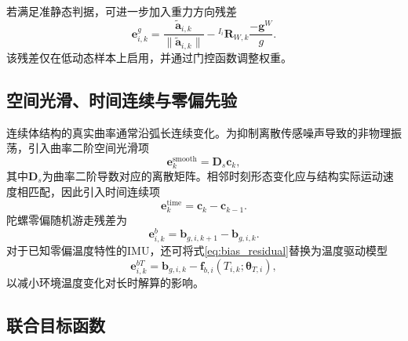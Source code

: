 若满足准静态判据，可进一步加入重力方向残差
\begin{equation}
    \bm e_{i,k}^{g}
    =\frac{\tilde{\bm a}_{i,k}}{\|\tilde{\bm a}_{i,k}\|}
    -{}^{I_i}\bm R_{W,k}\frac{-\bm g^W}{g}.
    \label{eq:gravity_residual}
\end{equation}
该残差仅在低动态样本上启用，并通过门控函数调整权重。

\subsection{空间光滑、时间连续与零偏先验}

连续体结构的真实曲率通常沿弧长连续变化。为抑制离散传感噪声导致的非物理振荡，引入曲率二阶空间光滑项
\begin{equation}
    \bm e_{k}^{\mathrm{smooth}}
    =\bm D_s\bm c_k,
    \label{eq:spatial_smoothness}
\end{equation}
其中$\bm D_s$为曲率二阶导数对应的离散矩阵。相邻时刻形态变化应与结构实际运动速度相匹配，因此引入时间连续项
\begin{equation}
    \bm e_{k}^{\mathrm{time}}
    =\bm c_k-\bm c_{k-1}.
    \label{eq:temporal_shape_residual}
\end{equation}
陀螺零偏随机游走残差为
\begin{equation}
    \bm e_{i,k}^{b}
    =\bm b_{g,i,k+1}-\bm b_{g,i,k}.
    \label{eq:bias_residual}
\end{equation}
对于已知零偏温度特性的IMU，还可将式\eqref{eq:bias_residual}替换为温度驱动模型
\begin{equation}
    \bm e_{i,k}^{bT}
    =\bm b_{g,i,k}-\bm f_{b,i}(T_{i,k};\bm\theta_{T,i}),
\end{equation}
以减小环境温度变化对长时解算的影响。

\subsection{联合目标函数}

